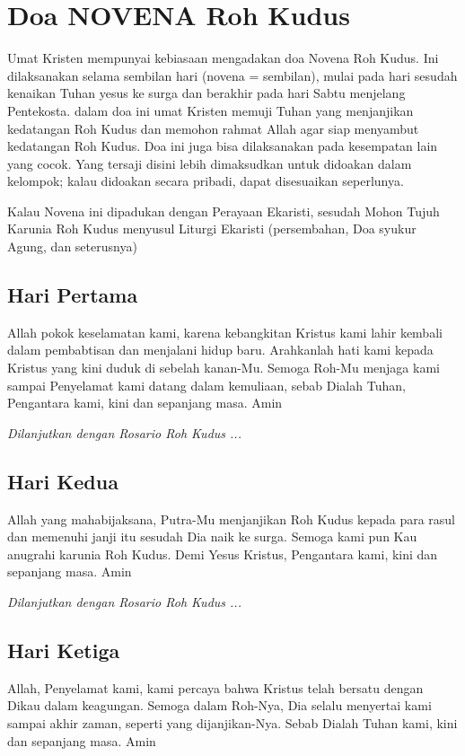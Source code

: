 \section{Doa NOVENA Roh Kudus}
\scriptsize
    Umat Kristen mempunyai kebiasaan mengadakan doa Novena Roh Kudus. Ini dilaksanakan selama sembilan hari (novena = sembilan), mulai pada hari sesudah kenaikan Tuhan yesus ke surga dan berakhir pada hari Sabtu menjelang Pentekosta. dalam doa ini umat Kristen memuji Tuhan yang menjanjikan kedatangan Roh Kudus dan memohon rahmat Allah agar siap menyambut kedatangan Roh Kudus. Doa ini juga bisa dilaksanakan pada kesempatan lain yang cocok. Yang tersaji disini lebih dimaksudkan untuk didoakan dalam kelompok; kalau didoakan secara pribadi, dapat disesuaikan seperlunya.

    Kalau Novena ini dipadukan dengan Perayaan Ekaristi, sesudah Mohon Tujuh Karunia Roh Kudus menyusul Liturgi Ekaristi (persembahan, Doa syukur Agung, dan seterusnya)
 
\normalsize
\subsection*{Hari Pertama}

    Allah pokok keselamatan kami, karena kebangkitan Kristus kami lahir kembali dalam pembabtisan dan menjalani hidup baru. Arahkanlah hati kami kepada Kristus yang kini duduk di sebelah kanan-Mu. Semoga Roh-Mu menjaga kami sampai Penyelamat kami datang dalam kemuliaan, sebab Dialah Tuhan, Pengantara kami, kini dan sepanjang masa. Amin
    
    \emph{Dilanjutkan dengan Rosario Roh Kudus ...}
    
\subsection*{Hari Kedua}

    Allah yang mahabijaksana, Putra-Mu menjanjikan Roh Kudus kepada para rasul dan memenuhi janji itu sesudah Dia naik ke surga. Semoga kami pun Kau anugrahi karunia Roh Kudus. Demi Yesus Kristus, Pengantara kami, kini dan sepanjang masa. Amin
    
    \emph{Dilanjutkan dengan Rosario Roh Kudus ...}
    
\subsection*{Hari Ketiga}

    Allah, Penyelamat kami, kami percaya bahwa Kristus telah bersatu dengan Dikau dalam keagungan. Semoga dalam Roh-Nya, Dia selalu menyertai kami sampai akhir zaman, seperti yang dijanjikan-Nya. Sebab Dialah Tuhan kami, kini dan sepanjang masa. Amin
    
